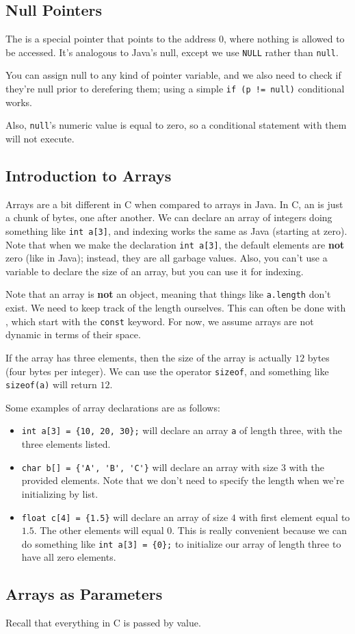 \subsection{Null Pointers}
The  is a special pointer that points to the address $0$, where nothing is allowed to be accessed. It's analogous to Java's null, except we use \verb!NULL! rather than \verb!null!. 

You can assign null to any kind of pointer variable, and we also need to check if they're null prior to derefering them; using a simple \verb|if (p != null)| conditional works. 

Also, \verb!null!'s numeric value is equal to zero, so a conditional statement with them will not execute.

\subsection{Introduction to Arrays}
Arrays are a bit different in C when compared to arrays in Java. In C, an  is just a chunk of bytes, one after another. We can declare an array of integers doing something like \verb!int a[3]!, and indexing works the same as Java (starting at zero).  Note that when we make the declaration \verb!int a[3]!, the default elements are \textbf{not} zero (like in Java); instead, they are all garbage values. Also, you can't use a variable to declare the size of an array, but you can use it for indexing. 


Note that an array is \textbf{not} an object, meaning that things like \verb!a.length! don't exist. We need to keep track of the length ourselves. This can often be done with , which start with the \verb!const! keyword. For now, we assume arrays are not dynamic in terms of their space. 


If the array has three elements, then the size of the array is actually $12$ bytes (four bytes per integer). We can use the operator \verb!sizeof!, and something like \verb!sizeof(a)! will return $12$.


Some examples of array declarations are as follows: \begin{itemize}
    \item \verb!int a[3] = {10, 20, 30};! will declare an array \verb!a! of length three, with the three elements listed. 
    \item \verb!char b[] = {'A', 'B', 'C'}! will declare an array with size $3$ with the provided elements. Note that we don't need to specify the length when we're initializing by list. 
    \item \verb!float c[4] = {1.5}! will declare an array of size $4$ with first element equal to $1.5$. The other elements will equal $0$. This is really convenient because we can do something like \verb!int a[3] = {0};! to initialize our array of length three to have all zero elements. 
\end{itemize}


\subsection{Arrays as Parameters}

Recall that everything in C is passed by value. 

